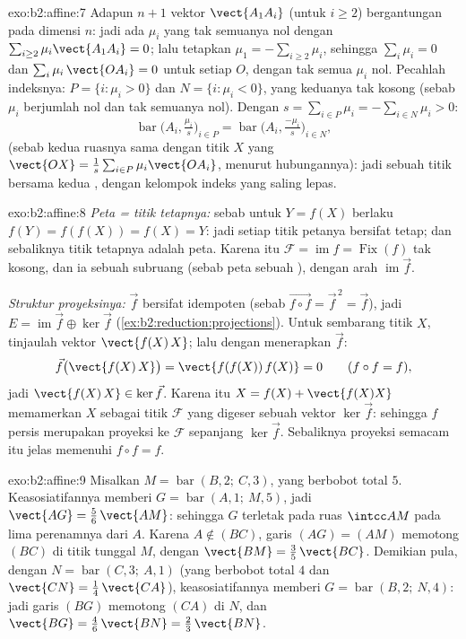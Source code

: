 \begin{solution}{exo:b2:affine:7}
Adapun $n + 1$ vektor $\vect{A_1A_i}$ (untuk $i \geq 2$) bergantungan pada
dimensi $n$: jadi ada $\mu_i$ yang tak semuanya nol dengan $\sum_{i\geq2}
\mu_i\vect{A_1A_i} = 0$; lalu tetapkan $\mu_1 = -\sum_{i \geq 2}\mu_i$, sehingga
$\sum_{i}\mu_i = 0$ dan $\sum_i \mu_i\,\vect{OA_i} = 0$ untuk setiap
$O$, dengan tak semua $\mu_i$ nol. Pecahlah indeksnya: $P = \{i : \mu_i >
0\}$ dan $N = \{i : \mu_i < 0\}$, yang keduanya tak kosong (sebab $\mu_i$ berjumlah
nol dan tak semuanya nol). Dengan $s = \sum_{i\in P}\mu_i =
-\sum_{i \in N}\mu_i > 0$:
\[
\operatorname{bar}\bigl(A_i, \tfrac{\mu_i}{s}\bigr)_{i \in P}
= \operatorname{bar}\bigl(A_i, \tfrac{-\mu_i}{s}\bigr)_{i \in N},
\]
(sebab kedua ruasnya sama dengan titik $X$ yang $\vect{OX} = \frac1s\sum_{i\in
P}\mu_i\vect{OA_i}$, menurut hubungannya): jadi sebuah titik bersama kedua
, dengan kelompok indeks yang saling lepas.
\end{solution}

\begin{solution}{exo:b2:affine:8}
\emph{Peta = titik tetapnya:} sebab untuk $Y = f(X)$ berlaku $f(Y) = f(f(X)) =
f(X) = Y$: jadi setiap titik petanya bersifat tetap; dan sebaliknya titik tetapnya adalah
peta. Karena itu $\mathcal{F} = \operatorname{im} f =
\operatorname{Fix}(f)$ tak kosong, dan ia sebuah subruang 
(sebab peta sebuah ), dengan arah $\operatorname{im}\vec f$.

\emph{Struktur proyeksinya:} $\vec f$ bersifat idempoten (sebab $\vec{f\circ
f} = \vec f^{\,2} = \vec f$), jadi $E = \operatorname{im}\vec f
\oplus \ker \vec f$ (\cref{ex:b2:reduction:projections}). Untuk sembarang
titik $X$, tinjaulah vektor $\vect{f(X)\,X}$; lalu dengan menerapkan $\vec f$:
\[
\vec f\bigl(\vect{f(X)\,X}\bigr) = \vect{f(f(X))\,f(X)} = 0
\qquad (f \circ f = f),
\]
jadi $\vect{f(X)\,X} \in \ker\vec f$. Karena itu $X = f(X) +
\vect{f(X)X}$ memamerkan $X$ sebagai titik $\mathcal{F}$ yang digeser
sebuah vektor $\ker\vec f$: sehingga $f$ persis merupakan proyeksi ke
$\mathcal{F}$ sepanjang $\ker\vec f$. Sebaliknya proyeksi semacam itu
jelas memenuhi $f \circ f = f$.
\end{solution}

\begin{solution}{exo:b2:affine:9}
Misalkan $M = \operatorname{bar}(B, 2;\ C, 3)$, yang berbobot total $5$.
Keasosiatifannya memberi $G = \operatorname{bar}(A, 1;\ M, 5)$, jadi
$\vect{AG} = \frac56\,\vect{AM}$: sehingga $G$ terletak pada ruas
$\intcc AM$ pada lima perenamnya dari $A$. Karena $A \notin
(BC)$, garis $(AG) = (AM)$ memotong $(BC)$ di titik tunggal
$M$, dengan $\vect{BM} = \frac35\,\vect{BC}$. Demikian pula, dengan $N =
\operatorname{bar}(C, 3;\ A, 1)$ (yang berbobot total $4$ dan $\vect{CN}
= \frac14\,\vect{CA}$), keasosiatifannya memberi $G =
\operatorname{bar}(B, 2;\ N, 4)$: jadi garis $(BG)$ memotong $(CA)$
di $N$, dan $\vect{BG} = \frac46\,\vect{BN} =
\frac23\,\vect{BN}$.
\end{solution}

